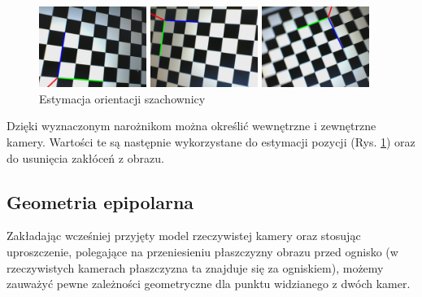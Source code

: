 \documentclass[oneside, eng]{mgr}
\begin{document}
\begin{figure}
\centering
		\begin{minipage}{3.5cm}
			\includegraphics[width=3.5cm]{left8.jpg}
		\end{minipage}
		\begin{minipage}{3.5cm}
			\includegraphics[width=3.5cm]{left17.jpg}
		\end{minipage}
		\begin{minipage}{3.5cm}
			\includegraphics[width=3.5cm]{left24.jpg}
		\end{minipage}
	\caption{Estymacja orientacji szachownicy}
	\label{fig:pose}
\end{figure}

Dzięki wyznaczonym narożnikom można określić wewnętrzne i zewnętrzne kamery. Wartości te są następnie wykorzystane do estymacji pozycji (Rys. \ref{fig:pose}) oraz do usunięcia zakłóceń z obrazu. 

\subsection{Geometria epipolarna}

Zakładając wcześniej przyjęty model rzeczywistej kamery oraz stosując uproszczenie, polegające na przeniesieniu płaszczyzny obrazu przed ognisko (w rzeczywistych kamerach płaszczyzna ta znajduje się za ogniskiem), możemy zauważyć pewne zależności geometryczne dla punktu widzianego z dwóch kamer. 
\end{document}
